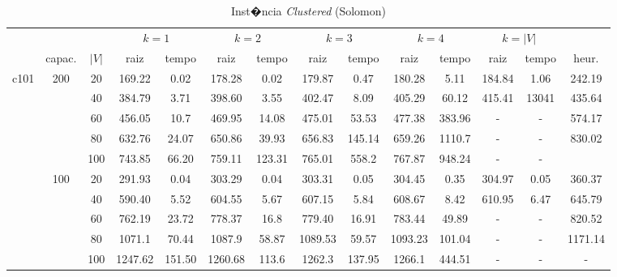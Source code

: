 \documentclass[12pt]{article}
\begin{document}
\begin{table}[!htb]
\centering
\footnotesize
\begin{tabular}{|c|c|c|c|c|c|c|c|c|c|c|c|c|c|}
\cline{4-13}
\multicolumn{3}{c}{} & \multicolumn{2}{|c}{$k=1$} & \multicolumn{2}{|c|}{$k=2$} & \multicolumn{2}{c|}{$k=3$} & \multicolumn{2}{c|}{$k=4$} & \multicolumn{2}{|c|}{$k=|V|$} & \multicolumn{1}{c}{}\\
\cline{2-14}
\multicolumn{1}{c}{} & \multicolumn{1}{|c}{capac.} & \multicolumn{1}{|c|}{$|V|$} & \multicolumn{1}{|c|}{raiz} & \multicolumn{1}{|c|}{tempo} & \multicolumn{1}{|c|}{raiz} & \multicolumn{1}{|c|}{tempo} & \multicolumn{1}{|c|}{raiz} & \multicolumn{1}{|c|}{tempo} & \multicolumn{1}{|c|}{raiz} & \multicolumn{1}{|c|}{tempo} & \multicolumn{1}{|c|}{raiz} & \multicolumn{1}{|c|}{tempo} & \multicolumn{1}{|c|}{heur.} \\
\hline
\multirow{10}{*}{c101}
& \multirow{5}{*}{200} & 20 & 169.22 & 0.02 & 178.28 & 0.02 & 179.87 & 0.47 & 180.28 & 5.11 & 184.84 & 1.06 & 242.19\\
\cline{3-14}
& \multirow{5}{*}{} & 40 & 384.79 & 3.71 & 398.60 & 3.55 & 402.47 & 8.09 & 405.29 & 60.12 & 415.41 & 13041 & 435.64\\
\cline{3-14}
& \multirow{5}{*}{} & 60 & 456.05 & 10.7 & 469.95 & 14.08 & 475.01 & 53.53 & 477.38 & 383.96 & - & - & 574.17\\
\cline{3-14}
& \multirow{5}{*}{} & 80 & 632.76 & 24.07 & 650.86 & 39.93 & 656.83 & 145.14 & 659.26 & 1110.7 & - & - & 830.02\\
\cline{3-14}
& \multirow{5}{*}{} & 100 & 743.85 & 66.20 & 759.11 & 123.31 & 765.01 & 558.2 & 767.87 & 948.24 & - & - &  \\ 
\cline{2-14}
& \multirow{5}{*}{100} & 20 & 291.93 & 0.04 & 303.29 & 0.04 & 303.31 & 0.05 & 304.45 & 0.35 & 304.97 & 0.05 & 360.37\\ 
\cline{3-14}
& \multirow{5}{*}{} & 40 & 590.40 & 5.52 & 604.55 & 5.67 & 607.15 & 5.84 & 608.67 & 8.42 & 610.95 & 6.47 & 645.79\\ 
\cline{3-14}
& \multirow{5}{*}{} & 60 & 762.19 & 23.72 & 778.37 & 16.8 & 779.40 & 16.91 & 783.44 & 49.89 & - & - & 820.52\\
\cline{3-14}
& \multirow{5}{*}{} & 80 & 1071.1 & 70.44 & 1087.9 & 58.87 & 1089.53 & 59.57 & 1093.23 & 101.04 & - & - & 1171.14 \\
\cline{3-14}
& \multirow{5}{*}{} & 100 & 1247.62 & 151.50 & 1260.68 & 113.6 & 1262.3 & 137.95 & 1266.1 & 444.51 & - & - & - \\
\hline
\end{tabular}
\caption{Inst�ncia \emph{Clustered} (Solomon)}
\label{tab:different-dynamic-approaches}
\end{table}
\end{document}
